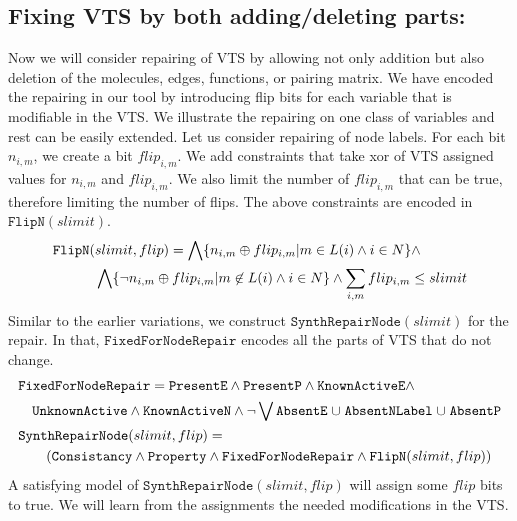 \subsection{Fixing VTS by both adding/deleting parts:}
%
Now we will consider repairing of VTS by allowing not only addition but also
deletion of the molecules, edges, functions, or pairing matrix.
%
We have encoded the repairing in our tool by introducing flip bits
for each variable that is modifiable in the VTS.
%
We illustrate the repairing on one class of variables and rest can be
easily extended.
%
Let us consider repairing of node labels.
%
For each bit $n_{i,m}$, we create a bit $flip_{i,m}$.
%
We add constraints that take xor of VTS assigned values for  $n_{i,m}$
and $flip_{i,m}$.
%
We also limit the number of $flip_{i,m}$ that can be true, therefore
limiting the number of flips.
%
The above constraints are encoded in $\texttt{FlipN}(slimit)$.
\begin{align*}
    &\texttt{FlipN}(slimit,flip) = \bigwedge \{n_{i,m}\oplus flip_{i,m}| m \in L(i) \land i \in N \} \land \\
  & \quad \quad \quad
    \bigwedge \{ \lnot n_{i,m}\oplus flip_{i,m}| m \not \in L(i) \land i \in N \} \land  \sum\limits_{i,m} flip_{i,m} \leq slimit
\end{align*}
%
Similar to the earlier variations, we construct
$\texttt{SynthRepairNode}(slimit)$ for the repair.
%
In that, $\texttt{FixedForNodeRepair}$ encodes all the parts of VTS that do not change.
\begin{align*}
    & \texttt{FixedForNodeRepair} =  \texttt{PresentE} \land  
      \texttt{PresentP} \land \texttt{KnownActiveE} 
      \land \\
  & \quad \texttt{UnknownActive} \land \texttt{KnownActiveN} \land \lnot 
    \bigvee \texttt{AbsentE} \;{\cup}\; \texttt{AbsentNLabel} \;{\cup}\;
    \texttt{AbsentP}\\
  &\texttt{SynthRepairNode}(slimit,flip) = \\
  & \quad\quad
    (  \texttt{Consistancy}\land \texttt{Property} \land
    \texttt{FixedForNodeRepair} \land \texttt{FlipN}(slimit,flip) )
\end{align*}
A satisfying model of $\texttt{SynthRepairNode}(slimit,flip)$ will assign some
$flip$ bits to true.
We will learn from the assignments the needed modifications in the VTS. 

